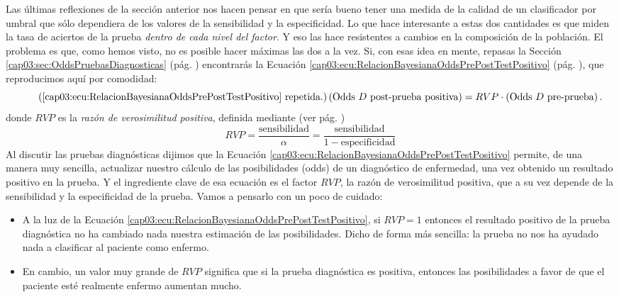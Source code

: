 

Las últimas reflexiones de la sección anterior nos hacen pensar en que sería bueno tener una medida de la calidad de un clasificador por umbral que sólo dependiera de los valores de la sensibilidad y la especificidad. Lo que hace interesante a estas dos cantidades es que miden la tasa de aciertos de la prueba {\em dentro de cada nivel del factor}. Y eso las hace resistentes a cambios en la composición de la población. El problema es que, como hemos visto, no es posible hacer máximas las dos a la vez.  Si, con esas idea en mente,  repasas la Sección \ref{cap03:sec:OddsPruebasDiagnosticas} (pág. \pageref{cap03:sec:OddsPruebasDiagnosticas}) encontrarás la Ecuación \ref{cap03:ecu:RelacionBayesianaOddsPrePostTestPositivo} (pág. \pageref{cap03:ecu:RelacionBayesianaOddsPrePostTestPositivo}), que reproducimos aquí por comodidad:
\begin{equation}\tag{\ref{cap03:ecu:RelacionBayesianaOddsPrePostTestPositivo} repetida.}
\left(\mbox{Odds $D$ post-prueba positiva}\right)=RVP\cdot \left(\mbox{Odds $D$ pre-prueba}\right).
\end{equation}
donde $RVP$ es la {\em razón de verosimilitud positiva}, definida mediante (ver pág. \pageref{cap03:ecu:RazonVerosimilitudPositiva} )
\[
RVP=\dfrac{\mbox{sensibilidad}}{\alpha}=\dfrac{\mbox{sensibilidad}}{1-\mbox{especificidad}}
\]
Al discutir las pruebas diagnósticas dijimos que la Ecuación \ref{cap03:ecu:RelacionBayesianaOddsPrePostTestPositivo} permite, de una manera muy sencilla, actualizar nuestro cálculo de las posibilidades (odds) de un diagnóstico de enfermedad, una vez obtenido un resultado positivo en la prueba. Y el ingrediente clave de esa ecuación es el factor $RVP$, la razón de verosimilitud positiva, que a su vez depende de la sensibilidad y la especificidad de la prueba. Vamos a pensarlo con un poco de cuidado:
\begin{itemize}
  \item A la luz de la Ecuación \ref{cap03:ecu:RelacionBayesianaOddsPrePostTestPositivo}, si $RVP = 1$ entonces el resultado positivo de la prueba diagnóstica no ha cambiado nada nuestra estimación de las posibilidades.  Dicho de forma más sencilla: la prueba no nos ha ayudado nada a clasificar al paciente como enfermo.

  \item En cambio, un valor muy grande de $RVP$ significa que si la prueba diagnóstica es positiva, entonces las posibilidades a favor de que el paciente esté realmente enfermo aumentan mucho.
\end{itemize}

